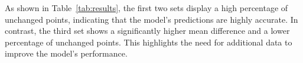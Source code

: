 As shown in Table~\ref{tab:results}, the first two sets display a high percentage of unchanged points, indicating that the model's predictions are highly accurate. In contrast, the third set shows a significantly higher mean difference and a lower percentage of unchanged points. This highlights the need for additional data to improve the model's performance.

